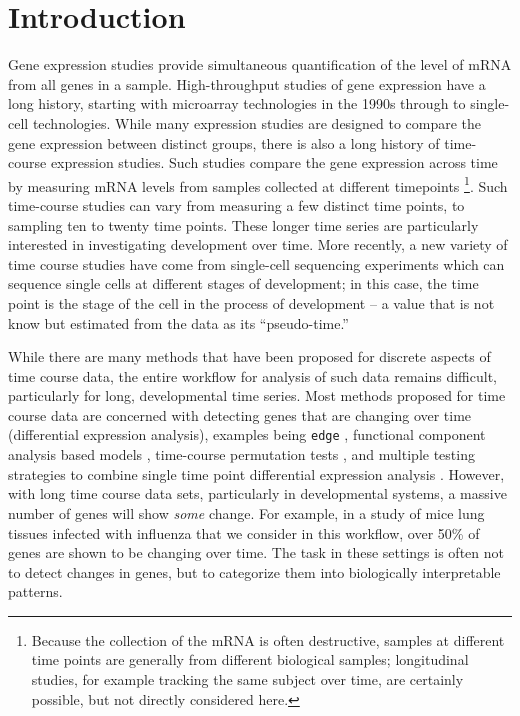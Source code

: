\documentclass[9pt,a4paper,]{extarticle}
\begin{document}
\hypertarget{introduction}{%
\section{Introduction}\label{introduction}}

Gene expression studies provide simultaneous quantification of the level of
mRNA from all genes in a sample. High-throughput studies of gene expression
have a long history, starting with microarray technologies in the 1990s
through to single-cell technologies. While many expression studies are
designed to compare the gene expression between distinct groups, there is also a
long history of time-course expression studies. Such studies compare the
gene expression
across time by measuring mRNA levels from samples collected at different
timepoints \footnote{Because the collection of the mRNA is often destructive, samples at
  different time points are generally from different biological samples;
  longitudinal studies, for example tracking the same subject over time, are
  certainly possible, but not directly considered here.}. Such time-course studies can vary from measuring a few
distinct time
points, to sampling ten to twenty time points. These longer time series are
particularly interested in investigating development over time. More recently,
a new variety of time course studies have come from single-cell sequencing experiments
\citep{shalek:single-cell, habib:div-seq, trapnell:dynamics}
which can sequence single cells at different stages of development; in this case,
the time point is the stage of the cell in the process of development -- a
value that is not know but estimated from the data as its ``pseudo-time.''

While there are many methods that have been proposed for discrete aspects of
time course data, the entire workflow for analysis of such data remains
difficult, particularly for long, developmental time series. Most methods
proposed for time course data are concerned with detecting genes that are
changing over time (differential expression analysis), examples being \texttt{edge}
\citep{storey:significance}, functional component analysis based models \citep{wu:more},
time-course permutation tests \citep{park:statistical}, and multiple testing
strategies to combine single time point differential expression analysis
\citep{sun:multiple}. However, with long time course data sets, particularly in
developmental systems, a massive number of genes will show \emph{some} change. For
example, in a study of mice lung tissues infected with influenza that we
consider in this workflow, over 50\% of genes
are shown to be changing over time. The task in these settings is often not to
detect changes in genes, but to categorize them into biologically interpretable
patterns.
\end{document}

